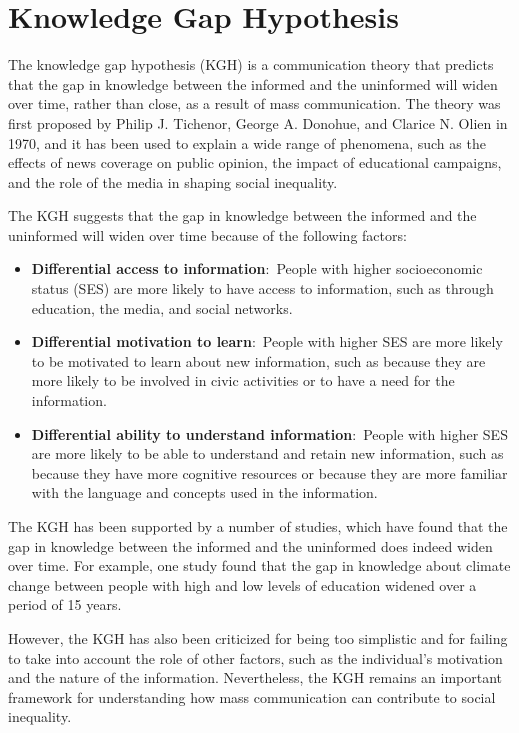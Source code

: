 \documentclass[
]{book}
\begin{document}
\section{Knowledge Gap Hypothesis}\label{knowledge-gap-hypothesis}

The knowledge gap hypothesis (KGH) is a communication theory that predicts that the gap in knowledge between the informed and the uninformed will widen over time, rather than close, as a result of mass communication. The theory was first proposed by Philip J. Tichenor, George A. Donohue, and Clarice N. Olien in 1970, and it has been used to explain a wide range of phenomena, such as the effects of news coverage on public opinion, the impact of educational campaigns, and the role of the media in shaping social inequality.

The KGH suggests that the gap in knowledge between the informed and the uninformed will widen over time because of the following factors:

\begin{itemize}
\item
  \textbf{Differential access to information}:~People with higher socioeconomic status (SES) are more likely to have access to information, such as through education, the media, and social networks.
\item
  \textbf{Differential motivation to learn}:~People with higher SES are more likely to be motivated to learn about new information, such as because they are more likely to be involved in civic activities or to have a need for the information.
\item
  \textbf{Differential ability to understand information}:~People with higher SES are more likely to be able to understand and retain new information, such as because they have more cognitive resources or because they are more familiar with the language and concepts used in the information.
\end{itemize}

The KGH has been supported by a number of studies, which have found that the gap in knowledge between the informed and the uninformed does indeed widen over time. For example, one study found that the gap in knowledge about climate change between people with high and low levels of education widened over a period of 15 years.

However, the KGH has also been criticized for being too simplistic and for failing to take into account the role of other factors, such as the individual's motivation and the nature of the information. Nevertheless, the KGH remains an important framework for understanding how mass communication can contribute to social inequality.
\end{document}
